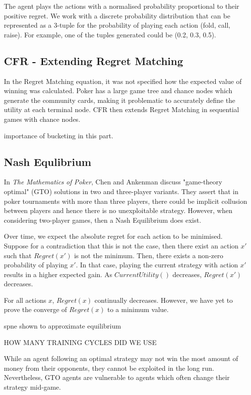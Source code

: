 \documentclass{article}
\begin{document}
The agent plays the actions with a normalised probability proportional to their positive regret. We work with a discrete probability distribution that can be represented as a 3-tuple for the probability of playing each action (fold, call, raise). For example, one of the tuples generated could be (0.2, 0.3, 0.5).

\subsection{CFR - Extending Regret Matching}

In the Regret Matching equation, it was not specified how the expected value of winning was calculated. Poker has a large game tree and chance nodes which generate the community cards, making it problematic to accurately define the utility at each terminal node. CFR then extends Regret Matching in sequential games with chance nodes.

importance of bucketing in this part.

\subsection{Nash Equlibrium}

In \textit{The Mathematics of Poker}, Chen and Ankenman discuss "game-theory optimal" (GTO) solutions in two and three-player variants. They assert that in poker tournaments with more than three players, there could be implicit collusion between players and hence there is no unexploitable strategy. However, when considering two-player games, then a Nash Equilibrium does exist. 

Over time, we expect the absolute regret for each action to be minimised. Suppose for a contradiction that this is not the case, then there exist an action $x'$ such that $Regret(x')$ is not the minimum. Then, there exists a non-zero probability of playing $x'$. In that case, playing the current strategy with action $x'$ results in a higher expected gain. As $CurrentUtility()$ decreases, $Regret(x')$ decreases.

For all actions $x$, $Regret(x)$ continually decreases. However, we have yet to prove the converge of $Regret(x)$ to a minimum value.

spne shown to approximate equilibrium

HOW MANY TRAINING CYCLES DID WE USE

While an agent following an optimal strategy may not win the most amount of money from their opponents, they cannot be exploited in the long run. Nevertheless, GTO agents are vulnerable to agents which often change their strategy mid-game.
\end{document}
